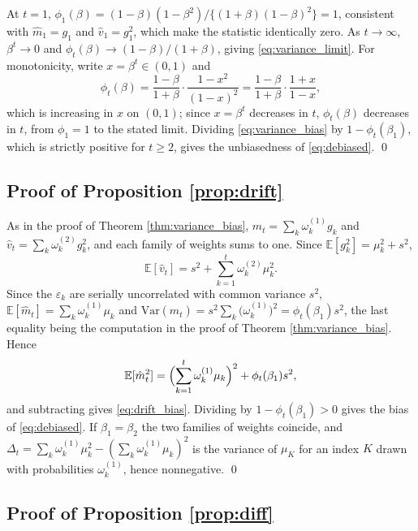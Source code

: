 \documentclass[a4paper,fleqn]{cas-dc}
\theoremstyle{plain}
\theoremstyle{definition}
\theoremstyle{remark}
\newenvironment{revblock}{}{}
\newcommand{\Var}{\mathrm{Var}}
\newcommand{\E}{\mathbb{E}}
\begin{document}
\begin{appendices}
At $t=1$, $\phi_1(\beta)=(1-\beta)(1-\beta^2)/\{(1+\beta)(1-\beta)^2\}=1$, consistent with $\hat m_1=g_1$ and $\hat v_1=g_1^2$, which make the statistic identically zero. As $t\to\infty$, $\beta^t\to0$ and $\phi_t(\beta)\to(1-\beta)/(1+\beta)$, giving \eqref{eq:variance_limit}. For monotonicity, write $x=\beta^{t}\in(0,1)$ and
\begin{equation}
\phi_t(\beta)=\frac{1-\beta}{1+\beta}\cdot\frac{1-x^{2}}{(1-x)^{2}}
=\frac{1-\beta}{1+\beta}\cdot\frac{1+x}{1-x},
\end{equation}
which is increasing in $x$ on $(0,1)$; since $x=\beta^{t}$ decreases in $t$, $\phi_t(\beta)$ decreases in $t$, from $\phi_1=1$ to the stated limit. Dividing \eqref{eq:variance_bias} by $1-\phi_t(\beta_1)$, which is strictly positive for $t\ge2$, gives the unbiasedness of \eqref{eq:debiased}. \qed

\subsection*{Proof of Proposition \ref{prop:drift}}

As in the proof of Theorem \ref{thm:variance_bias}, $\hat m_t=\sum_k\omega^{(1)}_kg_k$ and $\hat v_t=\sum_k\omega^{(2)}_kg^2_k$, and each family of weights sums to one. Since $\E[g^2_k]=\mu^2_k+s^2$,
\begin{equation}
\E[\hat v_t]=s^2+\sum_{k=1}^{t}\omega^{(2)}_k\mu^2_k .
\end{equation}
Since the $\varepsilon_k$ are serially uncorrelated with common variance $s^2$, $\E[\hat m_t]=\sum_k\omega^{(1)}_k\mu_k$ and $\Var(\hat m_t)=s^2\sum_k\bigl(\omega^{(1)}_k\bigr)^2=\phi_t(\beta_1)s^2$, the last equality being the computation in the proof of Theorem \ref{thm:variance_bias}. Hence
\begin{equation}
\E[\hat m^2_t]=\Bigl(\sum_{k=1}^{t}\omega^{(1)}_k\mu_k\Bigr)^{2}+\phi_t(\beta_1)s^2 ,
\end{equation}
and subtracting gives \eqref{eq:drift_bias}. Dividing by $1-\phi_t(\beta_1)>0$ gives the bias of \eqref{eq:debiased}. If $\beta_1=\beta_2$ the two families of weights coincide, and $\Delta_t=\sum_k\omega^{(1)}_k\mu^2_k-(\sum_k\omega^{(1)}_k\mu_k)^2$ is the variance of $\mu_K$ for an index $K$ drawn with probabilities $\omega^{(1)}_k$, hence nonnegative. \qed

\subsection*{Proof of Proposition \ref{prop:diff}}


\end{appendices}
\end{document}
